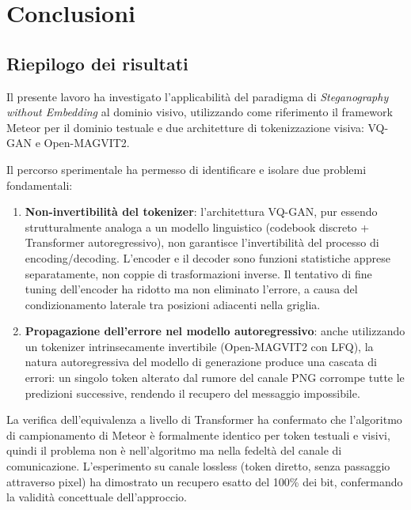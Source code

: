 
\chapter{Conclusioni}\label{ch:conclusioni}

\section{Riepilogo dei risultati}

Il presente lavoro ha investigato l'applicabilità del paradigma di \emph{Steganography without Embedding} al dominio visivo, utilizzando come riferimento il framework Meteor per il dominio testuale e due architetture di tokenizzazione visiva: VQ-GAN e Open-MAGVIT2.

Il percorso sperimentale ha permesso di identificare e isolare due problemi fondamentali:

\begin{enumerate}
	\item \textbf{Non-invertibilità del tokenizer}: l'architettura VQ-GAN, pur essendo strutturalmente analoga a un modello linguistico (codebook discreto + Transformer autoregressivo), non garantisce l'invertibilità del processo di encoding/decoding. L'encoder e il decoder sono funzioni statistiche apprese separatamente, non coppie di trasformazioni inverse. Il tentativo di fine tuning dell'encoder ha ridotto ma non eliminato l'errore, a causa del condizionamento laterale tra posizioni adiacenti nella griglia.
	
	\item \textbf{Propagazione dell'errore nel modello autoregressivo}: anche utilizzando un tokenizer intrinsecamente invertibile (Open-MAGVIT2 con LFQ), la natura autoregressiva del modello di generazione produce una cascata di errori: un singolo token alterato dal rumore del canale PNG corrompe tutte le predizioni successive, rendendo il recupero del messaggio impossibile.
\end{enumerate}

La verifica dell'equivalenza a livello di Transformer ha confermato che l'algoritmo di campionamento di Meteor è formalmente identico per token testuali e visivi, quindi il problema non è nell'algoritmo ma nella fedeltà del canale di comunicazione. L'esperimento su canale lossless (token diretto, senza passaggio attraverso pixel) ha dimostrato un recupero esatto del 100\% dei bit, confermando la validità concettuale dell'approccio.


